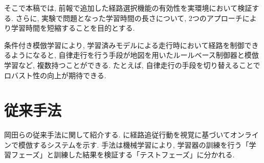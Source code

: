 \documentclass{jarticle}
\begin{document}
そこで本稿では, 前報\cite{mech}で追加した経路選択機能の有効性を実環境において検証する. さらに, 実験で問題となった学習時間の長さについて, 2つのアプローチにより学習時間を短縮することを目的とする.

条件付き模倣学習により, 学習済みモデルによる走行時において経路を制御できるようになると, 自律走行を行う手段が地図を用いたルールベース制御器と模倣学習など, 複数持つことができる. たとえば, 自律走行の手段を切り替えることでロバスト性の向上が期待できる.




\section{従来手法}
岡田らの従来手法に関して紹介する. に経路追従行動を視覚に基づいてオンラインで模倣するシステムを示す. 手法は機械学習により, 学習器の訓練を行う「学習フェーズ」と訓練した結果を検証する「テストフェーズ」に分かれる.
\end{document}
